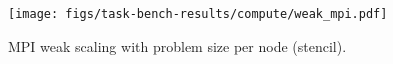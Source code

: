 \begin{figure}[t]
\centering
\texttt{[image: figs/task-bench-results/compute/weak\_mpi.pdf]}
\vspace{-0.7cm}
\caption{MPI weak scaling with problem size per node (stencil).\label{fig:weak-scaling-mpi}}
\vspace{-0.1cm}
\end{figure}
